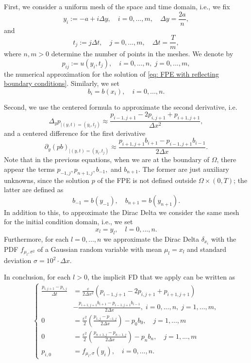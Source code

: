 \documentclass{amsart}
\begin{document}
First, we consider a uniform mesh of the space and time domain, i.e., we fix
$$
y_i := -a + i \Delta y, \quad i =0,...,m,\quad  \Delta y = \frac{2a}{n},
$$
and
$$
t_j := j \Delta t, \quad j = 0,...,m, \quad  \Delta t = \frac{T}{m},
$$
where $n,m >0$ determine the number of points in the meshes. We denote by
$$
p_{ij} := u(y_i, t_j), \quad i = 0,...,n, \; j = 0,...,m,
$$
the numerical approximation for the solution of \eqref{eq: FPE with reflecting boundary conditions}. Similarly, we set
$$
b_i = b(x_i), \quad i = 0,...,n.
$$

Second, we use the centered formula to approximate the second derivative, i.e.
$$
\Delta_y p_{\mid (y,t) = (y_i, t_j)} \approx \frac{p_{i-1,j+1}- 2p_{i,j+1}+p_{i+1,j+1}}{\Delta x^2},
$$
and a centered difference for the first derivative
$$
\partial_y(pb)_{\mid (y,t) = (y_i, t_j)} \approx \frac{p_{i+1,j+1}b_{i+1}-p_{i-1,j+1}b_{i-1}}{2\Delta x}.
$$
Note that in the previous equations, when we are at the boundary of $\Omega$, there appear the terms $p_{-1,j}, p_{n+1,j}, b_{-1},$ and $ b_{n+1}  $. The former are just auxiliary unknowns, since the solution $p$ of the FPE is not defined outside $\Omega \times (0,T)$; the latter are defined as
$$
b_{-1} = b(y_{-1}), \quad b_{n+1} = b(y_{n+1}).
$$
In addition to this, to approximate the Dirac Delta we consider the same mesh for the initial condition domain, i.e., we set
$$
x_l = y_l, \quad l = 0,...,n.
$$
Furthermore, for each $l =0,...,n$ we approximate the Dirac Delta $\delta_{x_i}$ with the PDF $f_{\mu_l, \sigma^2}$ of a Gaussian random variable with mean $\mu_l = x_l$ and standard deviation $\sigma = 10^{2} \cdot \Delta x$.

In conclusion, for each $l >0$, the implicit FD that we apply can be written as
\begin{align}
\begin{cases}
        \frac{p_{i,j+1}-p_{i,j}}{\Delta t} &= \frac{\varepsilon}{2\Delta x^2} \left(p_{i-1,j+1}- 2p_{i,j+1}+ p_{i+1,j+1} \right)\\
        &-\frac{p_{i+1,j+1}b_{i+1} - p_{i-1,j+1}b_{i-1}}{2\Delta x}, \;i =  0,...,n,\; j = 1,..., m, \\
         0 & =  
        \frac{\varepsilon^2}{2} \left(\frac{p_{1,j}- p_{-1,j}}{2\Delta x} \right) - p_0b_0, \quad j =1,...,m  \\
        0&= 
        \frac{\varepsilon^2}{2} \left(\frac{p_{n+1,j}- p_{n-1,j}}{2\Delta x} \right) - p_nb_n , \quad j =1,...,m\\
        p_{i,0} &= f_{\mu_l, \sigma }(y_i), \quad i =0,...,n.
            \label{eq: implicit FD FPE}
\end{cases}
    \end{align}   
\end{document}
